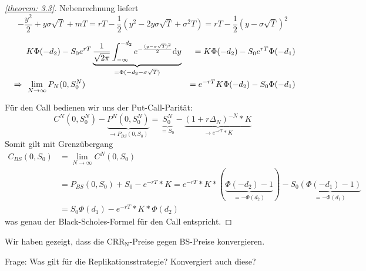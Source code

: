\begin{proof}[\cref{theorem: 3.3}]
	Nebenrechnung liefert
	\begin{equation*}
		-\frac{y^2}{2} + y \sigma \sqrt{T} + mT = rT - \frac{1}{2} (y^2 - 2y \sigma \sqrt{T} + \sigma^2 T) = rT - \frac{1}{2} (y - \sigma\sqrt{T})^2
	\end{equation*}
	
	\begin{alignat*}{2}
		&K \Phi(-d_2) - S_0 e^{rT} \underbrace{\frac{1}{\sqrt{2 \pi}} \int_{-\infty}^{-d_2} e^{-\frac{(y-\sigma \sqrt{T})^2}{2}} \mathrm{d}{y}}_{= \Phi(-d_2 - \sigma \sqrt{T})}
		&= K \Phi(-d_2) - S_0 e^{rT} \Phi(-d_1) \\
		\enskip \Rightarrow \enskip &\lim_{N \to \infty} P_N(0,S_0^N) &= e^{-rT} K \Phi(-d_2) - S_0 \Phi(-d_1)
	\end{alignat*}
	
	Für den Call bedienen wir uns der Put-Call-Parität: 
	\begin{equation*}
		C^N(0,S_0^N) - \underbrace{P^N(0,S_0^N)}_{\to P_{BS}(0,S_0)} = \underbrace{S_0^N}_{=S_0} - \underbrace{(1+ r \Delta_N)^{-N} * K}_{\to e^{-cT} * K}
	\end{equation*}
	Somit gilt mit Grenzübergang
	\begin{align*}
		C_{BS}(0,S_0) &= \lim_{N \to \infty} C^N(0,S_0) \\
		&= P_{BS}(0,S_0) + S_0 - e^{-rT} * K = e^{-rT} * K * (\underbrace{\Phi(-d_2) - 1}_{= - \Phi(d_2)}) - S_0 \underbrace{(\Phi(-d_1) - 1)}_{= - \Phi(d_1)} \\
		&= S_0 \Phi(d_1) - e^{-rT} * K * \Phi(d_2)
	\end{align*}
	was genau der Black-Scholes-Formel für den Call entspricht.
\end{proof}

Wir haben gezeigt, dass die $\text{CRR}_\text{N}$-Preise gegen BS-Preise konvergieren.

Frage: Was gilt für die Replikationsstrategie? Konvergiert auch diese?

